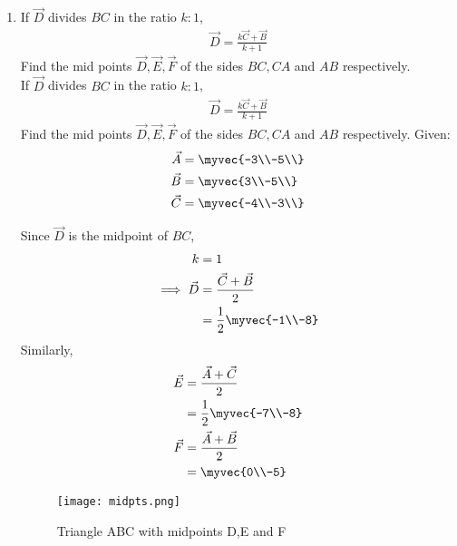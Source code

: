 \documentclass[11pt]{book}
\begin{document}
\begin{enumerate}[label=\thesection.\arabic*.,ref=\thesection.\theenumi]

\item  If $\vec{D}$ divides $BC$ in the ratio $k : 1$,
		\begin{align}
			\vec{D}= \frac{k\vec{C}+\vec{B}}{k+1}
		\end{align}
Find the mid points $\vec{D}, \vec{E}, \vec{F}$ of the sides $BC, CA$ and $AB$ respectively.\\
If $\vec{D}$ divides $BC$ in the ratio $k : 1$,
\begin{align}
\vec{D}= \frac{k\vec{C}+\vec{B}}{k+1}
\end{align}
Find the mid points $\vec{D}, \vec{E}, \vec{F}$ of the sides $BC, CA$ and $AB$ respectively.
\newline
Given:
\begin{align}
\vec{A} &= \myvec{-3\\-5\\}\\
\vec{B} &= \myvec{3\\-5\\}\\
\vec{C} &= \myvec{-4\\-3\\}
\end{align}

\solution
Since $\vec{D}$ is the midpoint of $BC$,
\begin{align}
k &= 1\\
\implies \vec{D} &= \frac{\vec{C} + \vec{B}}{2}\\
&= \frac{1}{2}\myvec{-1\\-8}
\end{align}
Similarly,
\begin{align}
\vec{E} &= \frac{\vec{A} + \vec{C}}{2}\\
&= \frac{1}{2}\myvec{-7\\-8}\\
\vec{F} &= \frac{\vec{A} + \vec{B}}{2}\\
&= \myvec{0\\-5}
\end{align}
\begin{figure}[H]
\centering
\texttt{[image: midpts.png]}
\caption{Triangle ABC with midpoints D,E and F}
\end{figure}  


\end{enumerate}
\end{document}
